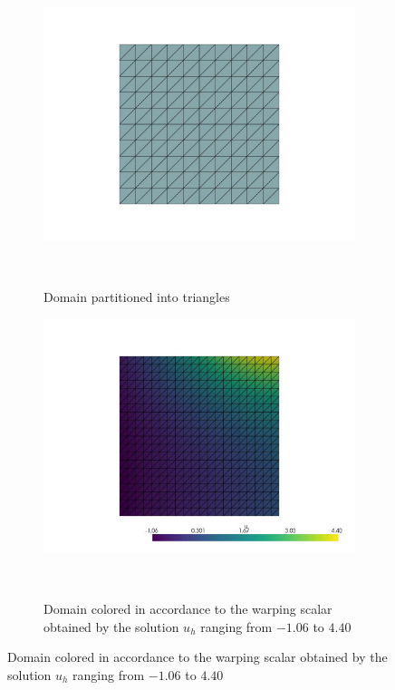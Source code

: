 \begin{figure}[ht]
    \centering
    \begin{subfigure}{.49\textwidth}
        \centering
        \includegraphics[width=\textwidth]{Afsnit/Application/figurer/screenshot_1.jpeg}
        \caption{Domain partitioned into triangles}~\label{fig:FEM_plot_domain}
      \end{subfigure}
    \begin{subfigure}{.49\textwidth}
        \centering
        \includegraphics[width=\textwidth]{Afsnit/Application/figurer/screenshot_2.jpeg}
        \caption{Domain colored in accordance to the warping scalar obtained by the solution $u_h$ ranging from $-1.06$ to $4.40$}~\label{fig:FEM_plot_warped_domain}

\end{subfigure}
\end{figure}
